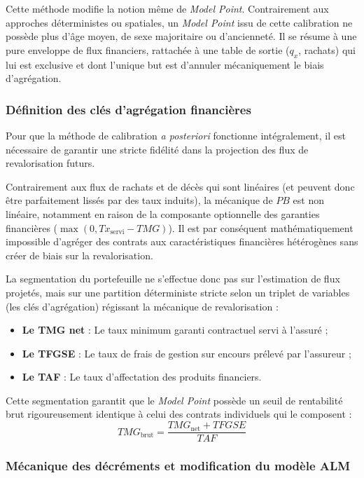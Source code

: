 Cette méthode modifie la notion même de \textit{Model Point}. Contrairement aux approches déterministes ou spatiales, un \textit{Model Point} issu de cette calibration ne possède plus d'âge moyen, de sexe majoritaire ou d'ancienneté. Il se résume à une pure enveloppe de flux financiers, rattachée à une table de sortie ($q_x$, rachats) qui lui est exclusive et dont l'unique but est d'annuler mécaniquement le biais d'agrégation.

\subsubsection{Définition des clés d'agrégation financières}

Pour que la méthode de calibration \textit{a posteriori} fonctionne intégralement, il est nécessaire de garantir une stricte fidélité dans la projection des flux de revalorisation futurs. 

Contrairement aux flux de rachats et de décès qui sont linéaires (et peuvent donc être parfaitement lissés par des taux induits), la mécanique de $PB$ est non linéaire, notamment en raison de la composante optionnelle des garanties financières ($\max(0, Tx_{\text{servi}} - TMG)$). Il est par conséquent mathématiquement impossible d'agréger des contrats aux caractéristiques financières hétérogènes sans créer de biais sur la revalorisation.

La segmentation du portefeuille ne s'effectue donc pas sur l'estimation de flux projetés, mais sur une partition déterministe stricte selon un triplet de variables (les clés d'agrégation) régissant la mécanique de revalorisation :
\begin{itemize}
    \item \textbf{Le TMG net} : Le taux minimum garanti contractuel servi à l'assuré ;
    \item \textbf{Le TFGSE} : Le taux de frais de gestion sur encours prélevé par l'assureur ;
    \item \textbf{Le TAF} : Le taux d'affectation des produits financiers.
\end{itemize}

Cette segmentation garantit que le \textit{Model Point} possède un seuil de rentabilité brut rigoureusement identique à celui des contrats individuels qui le composent :
\begin{equation}
    TMG_{\text{brut}} = \frac{TMG_{\text{net}} + TFGSE}{TAF}
\end{equation}

\subsubsection{Mécanique des décréments et modification du modèle ALM}

